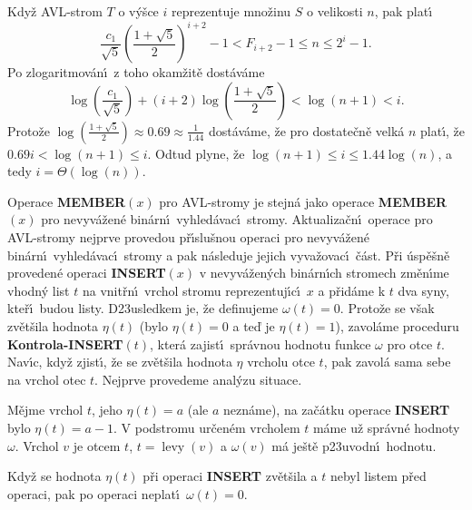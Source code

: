 \documentclass[a4paper,12pt]{article}
\DeclareMathOperator*{\levy}{levy}
\begin{document}
\flushpar Kdy\v z AVL-strom $T$ o v\'y\v sce $i$ reprezentuje mno\v zinu $
S$ o 
velikosti $n$, pak plat\'\i\ 
$$\frac {c_1}{\sqrt 5}(\frac {1+\sqrt 5}2)^{i+2}-1<F_{i+2}-1\le n
\le 2^i-1.$$
Po zlogaritmov\'an\'\i\ z toho okam\v zit\v e dost\'av\'ame
$$\log(\frac {c_1}{\sqrt 5})+(i+2)\log(\frac {1+\sqrt 5}2)<\log(n
+1)<i.$$
Proto\v ze $\log(\frac {1+\sqrt 5}2)\approx 0.69\approx\frac 1{1.
44}$ dost\'av\'ame, \v ze pro dostate\v cn\v e velk\'a $n$ 
plat\'\i , \v ze $0.69i<\log(n+1)\le i$. Odtud plyne, \v ze 
$\log(n+1)\le i\le 1.44\log(n)$, a tedy $i=\Theta (\log(n))$.
\medskip

\flushpar Operace {\bf MEMBER$(x)$} pro AVL-stromy je stejn\'a jako 
ope\-race {\bf MEMBER$(x)$} pro nevy\-v\'a\-\v zen\'e bin\'arn\'\i\ vyhled\'avac\'\i\ 
stro\-my. Aktualiza\v cn\'\i\ operace pro AVL-stromy nejprve provedou 
p\v r\'\i slu\v snou ope\-raci pro nevyv\'a\v zen\'e bin\'arn\'\i\ vyhled\'avac\'\i\ stromy 
a pak n\'asle\-du\-je jejich vyva\v zovac\'\i\ \v c\'ast. P\v ri \'usp\v e\v sn\v e 
proveden\'e operaci {\bf IN\-SERT$(x)$} v nevyv\'a\v zen\'ych bin\'arn\'\i ch 
stromech zm\v en\'\i me vhod\-n\'y list $t$ na vnit\v rn\'\i\ vrchol 
stromu reprezentuj\'\i c\'\i\ $x$ a p\v rid\'ame k $t$ dva syny, kte\v r\'\i\ 
budou listy. D\accent23usledkem je, \v ze definujeme 
$\omega (t)=0$. Proto\v ze se v\v sak zv\v et\v sila hodnota $\eta 
(t)$ (bylo 
$\eta (t)=0$ a te\v d je $\eta (t)=1$), zavol\'ame proceduru 
{\bf Kontrola-INSERT$(t)$}, kter\'a zajist\'\i\ spr\'avnou hodnotu 
funkce $\omega$ pro otce $t$. Nav\'\i c, kdy\v z zjist\'\i , \v ze se zv\v et\v sila 
hodnota $\eta$ vrcholu otce $t$, pak zavol\'a sama sebe na vrchol 
otec $t$. Nejprve provedeme anal\'yzu situace. 
\medskip

\flushpar M\v ejme vrchol $t$, jeho $\eta (t)=a$ (ale $a$ nezn\'ame), na 
za\v c\'atku 
ope\-ra\-ce {\bf INSERT} bylo $\eta (t)=a-1$.  V podstromu ur\v cen\'em 
vrcholem $t$ m\'ame u\v z spr\'avn\'e hodnoty $\omega$.  Vrchol $
v$ je otcem $t$, 
$t=\levy(v)$ a $\omega (v)$ m\'a je\v st\v e p\accent23uvodn\'\i\ hodnotu.  
\medskip

\proclaim{Lemma}Kdy\v z se hodnota $\eta (t)$ p\v ri operaci {\bf INSERT }
zv\v et\v sila a $t$ nebyl listem p\v red operaci, pak po operaci 
neplat\'\i\ $\omega (t)=0$.
\endproclaim
\end{document}
